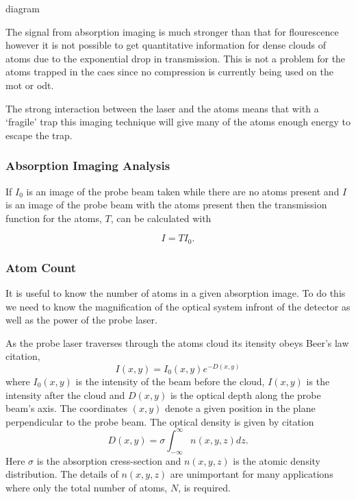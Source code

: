 {\color{red} diagram}

The signal from absorption imaging is much stronger than that for flourescence however it is not possible to get quantitative information for dense clouds of atoms due to the exponential drop in transmission\cite{moravchik_imaging_2009}. This is not a problem for the atoms trapped in the \gls{caes} since no compression is currently being used on the \gls{mot} or \gls{odt}.

The strong interaction between the laser and the atoms means that with a `fragile' trap this imaging technique will give many of the atoms enough energy to escape the trap.

\subsubsection{Absorption Imaging Analysis}

If $I_0$ is an image of the probe beam taken while there are no atoms present and $I$ is an image of the probe beam with the atoms present then the transmission function for the atoms, $T$, can be calculated with

\begin{equation}\label{eq:transmission_function_1}
I = T I_0.
\end{equation}

\subsubsection{Atom Count}


It is useful to know the number of atoms in a given absorption image. To do this we need to know the magnification of the optical system infront of the detector as well as the power of the probe laser.

As the probe laser traverses through the atoms cloud its itensity obeys Beer's law{\color{red} citation},
\begin{equation}\label{eq:beers_law}
I(x, y) = I_0(x, y)e^{-D(x, y)}
\end{equation}
where $I_0(x, y)$ is the intensity of the beam before the cloud, $I(x, y)$ is the intensity after the cloud and $D(x, y)$ is the optical depth along the probe beam's axis. The coordinates $(x, y)$ denote a given position in the plane perpendicular to the probe beam. The optical density is given by{\color{red} citation}
\begin{equation}\label{eq:optical_density}
D(x, y) = \sigma \int_{-\infty}^{\infty}n(x, y, z)dz.
\end{equation}
Here $\sigma$ is the absorption cress-section and $n(x, y, z)$ is the atomic density distribution. The details of $n(x, y, z)$ are unimportant for many applications where only the total number of atoms, $N$, is required.

